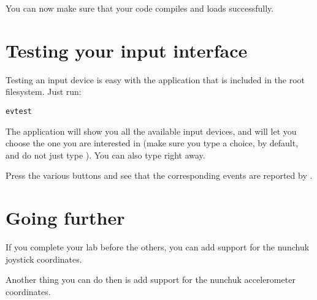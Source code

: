 You can now make sure that your code compiles and loads successfully.

\section{Testing your input interface}

Testing an input device is easy with the  application
that is included in the root filesystem. Just run:

\begin{verbatim}
evtest
\end{verbatim}

The application will show you all the available input devices, and will let
you choose the one you are interested in (make sure you type a choice,
 by default, and do not just type \code{[Enter]}). You can also
type  right away.

Press the various buttons and see that the corresponding events are
reported by .

\section{Going further}

If you complete your lab before the others, you can add support for the
nunchuk joystick coordinates.

Another thing you can do then is add support for the nunchuk accelerometer
coordinates.
